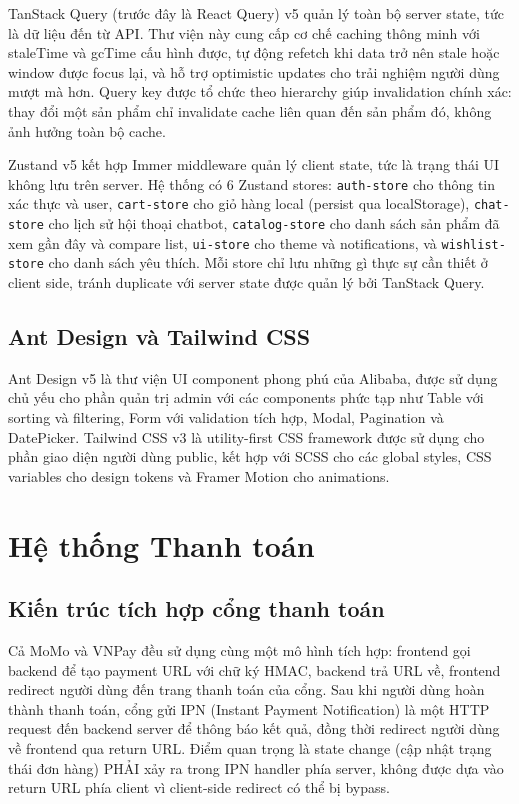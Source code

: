 TanStack Query (trước đây là React Query) v5 quản lý toàn bộ server state, tức là dữ liệu đến từ API. Thư viện này cung cấp cơ chế caching thông minh với staleTime và gcTime cấu hình được, tự động refetch khi data trở nên stale hoặc window được focus lại, và hỗ trợ optimistic updates cho trải nghiệm người dùng mượt mà hơn. Query key được tổ chức theo hierarchy giúp invalidation chính xác: thay đổi một sản phẩm chỉ invalidate cache liên quan đến sản phẩm đó, không ảnh hưởng toàn bộ cache.

Zustand v5 kết hợp Immer middleware quản lý client state, tức là trạng thái UI không lưu trên server. Hệ thống có 6 Zustand stores: \texttt{auth-store} cho thông tin xác thực và user, \texttt{cart-store} cho giỏ hàng local (persist qua localStorage), \texttt{chat-store} cho lịch sử hội thoại chatbot, \texttt{catalog-store} cho danh sách sản phẩm đã xem gần đây và compare list, \texttt{ui-store} cho theme và notifications, và \texttt{wishlist-store} cho danh sách yêu thích. Mỗi store chỉ lưu những gì thực sự cần thiết ở client side, tránh duplicate với server state được quản lý bởi TanStack Query.

\subsection{Ant Design và Tailwind CSS}

Ant Design v5 là thư viện UI component phong phú của Alibaba, được sử dụng chủ yếu cho phần quản trị admin với các components phức tạp như Table với sorting và filtering, Form với validation tích hợp, Modal, Pagination và DatePicker. Tailwind CSS v3 là utility-first CSS framework được sử dụng cho phần giao diện người dùng public, kết hợp với SCSS cho các global styles, CSS variables cho design tokens và Framer Motion cho animations.

\section{Hệ thống Thanh toán}

\subsection{Kiến trúc tích hợp cổng thanh toán}

Cả MoMo và VNPay đều sử dụng cùng một mô hình tích hợp: frontend gọi backend để tạo payment URL với chữ ký HMAC, backend trả URL về, frontend redirect người dùng đến trang thanh toán của cổng. Sau khi người dùng hoàn thành thanh toán, cổng gửi IPN (Instant Payment Notification) là một HTTP request đến backend server để thông báo kết quả, đồng thời redirect người dùng về frontend qua return URL. Điểm quan trọng là state change (cập nhật trạng thái đơn hàng) PHẢI xảy ra trong IPN handler phía server, không được dựa vào return URL phía client vì client-side redirect có thể bị bypass.

